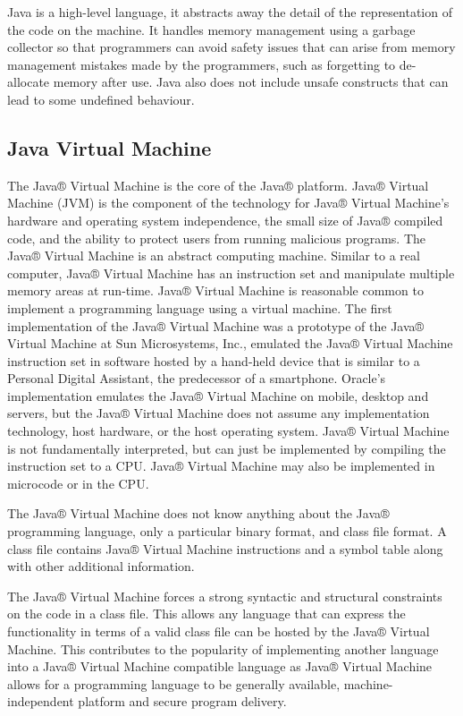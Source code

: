 Java is a high-level language, it abstracts away the detail of the representation of the code on the machine. It handles memory management using a garbage collector so that programmers can avoid safety issues that can arise from memory management mistakes made by the programmers, such as forgetting to de-allocate memory after use. Java also does not include unsafe constructs that can lead to some undefined behaviour. 
\cite{java}

\subsection{Java Virtual Machine}
The Java® Virtual Machine is the core of the Java® platform. Java® Virtual Machine (JVM) is the component of the technology for Java® Virtual Machine's hardware and operating system independence, the small size of Java® compiled code, and the ability to protect users from running malicious programs.
The Java® Virtual Machine is an abstract computing machine. Similar to a real computer, Java® Virtual Machine has an instruction set and manipulate multiple memory areas at run-time. Java® Virtual Machine is reasonable common to implement a programming language using a virtual machine.
The first implementation of the Java® Virtual Machine was a prototype of the Java® Virtual Machine at Sun Microsystems, Inc., emulated the Java® Virtual Machine instruction set in software hosted by a hand-held device that is similar to a Personal Digital Assistant, the predecessor of a smartphone. Oracle's implementation emulates the Java® Virtual Machine on mobile, desktop and servers, but the Java® Virtual Machine does not assume any implementation technology, host hardware, or the host operating system. Java® Virtual Machine is not fundamentally interpreted, but can just be implemented by compiling the instruction set to a CPU. Java® Virtual Machine may also be implemented in microcode or in the CPU.

The Java® Virtual Machine does not know anything about the Java® programming language, only a particular binary format, and class file format. A class file contains Java® Virtual Machine instructions and a symbol table along with other additional information.

The Java® Virtual Machine forces a strong syntactic and structural constraints on the code in a class file. This allows any language that can express the functionality in terms of a valid class file can be hosted by the Java® Virtual Machine. This contributes to the popularity of implementing another language into a Java® Virtual Machine compatible language as Java® Virtual Machine allows for a programming language to be generally available, machine-independent platform and secure program delivery. \cite{java}

